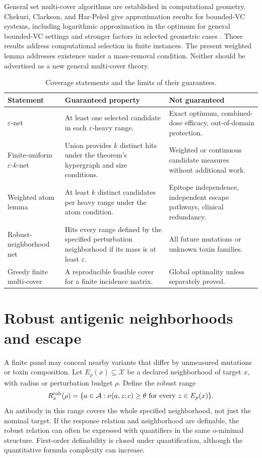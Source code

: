 \documentclass[11pt,a4paper]{article}
\newcommand{\Acal}{\mathcal A}
\newcommand{\Xcal}{\mathcal X}
\newcommand{\eps}{\varepsilon}
\begin{document}
General set multi-cover algorithms are established in computational geometry. Chekuri, Clarkson, and Har-Peled give approximation results for bounded-VC systems, including logarithmic approximation in the optimum for general bounded-VC settings and stronger factors in selected geometric cases \citep{Chekuri2009}. Those results address computational selection in finite instances. The present weighted lemma addresses existence under a mass-removal condition. Neither should be advertised as a new general multi-cover theory.
\begin{table}[t]\centering\small\caption{Coverage statements and the limits of their guarantees.}\begin{tabularx}{\linewidth}{p{.24\linewidth}p{.35\linewidth}X}\toprule Statement&Guaranteed property&Not guaranteed\\\midrule $\eps$-net&At least one selected candidate in each $\eps$-heavy range.&Exact optimum, combined-dose efficacy, out-of-domain protection.\\ Finite-uniform $\eps$-$k$-net&Union provides $k$ distinct hits under the theorem's hypergraph and size conditions.&Weighted or continuous candidate measures without additional work.\\ Weighted atom lemma&At least $k$ distinct candidates per heavy range under the atom condition.&Epitope independence, independent escape pathways, clinical redundancy.\\ Robust-neighborhood net&Hits every range defined by the specified perturbation neighborhood if its mass is at least $\eps$.&All future mutations or unknown toxin families.\\ Greedy finite multi-cover&A reproducible feasible cover for a finite incidence matrix.&Global optimality unless separately proved.\\\bottomrule\end{tabularx}\label{tab:guarantees}\end{table}

\section{Robust antigenic neighborhoods and escape}
A finite panel may conceal nearby variants that differ by unmeasured mutations or toxin composition. Let $E_\rho(x)\subseteq\Xcal$ be a declared neighborhood of target $x$, with radius or perturbation budget $\rho$. Define the robust range
\begin{equation}R_x^{\rm rob}(\rho)=\{a\in\Acal:\nu(a,z;c)\geq\theta\text{ for every }z\in E_\rho(x)\}.\label{eq:robustrange}\end{equation}
An antibody in this range covers the whole specified neighborhood, not just the nominal target. If the response relation and neighborhood are definable, the robust relation can often be expressed with quantifiers in the same o-minimal structure. First-order definability is closed under quantification, although the quantitative formula complexity can increase.
\end{document}
